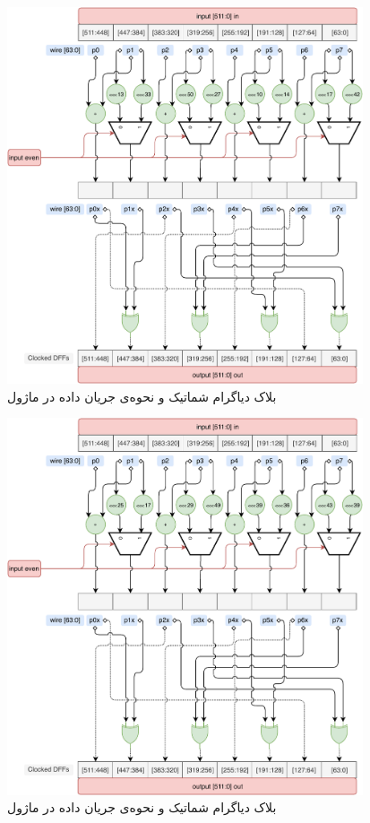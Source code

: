 \begin{figure}[H]
	\centering
	\includegraphics[width=10.5cm]{Images/VerilogDocumentation/diagrams_round2.pdf}	
	\caption{
		بلاک دیاگرام شماتیک و نحوه‌ی جریان داده در ماژول 
	}
\end{figure}
\begin{figure}[H]
	\centering
	\includegraphics[width=10.5cm]{Images/VerilogDocumentation/diagrams_round3.pdf}	
	\caption{
		بلاک دیاگرام شماتیک و نحوه‌ی جریان داده در ماژول 
	}
\end{figure}

